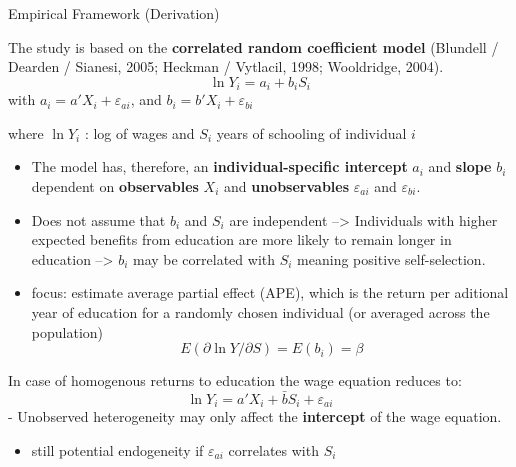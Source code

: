 \documentclass[10pt,ignorenonframetext,]{beamer}
\providecommand{\tightlist}{%
  \setlength{\itemsep}{0pt}\setlength{\parskip}{0pt}}
\begin{document}
\begin{frame}[allowframebreaks]{Empirical Framework (Derivation)}
\protect\hypertarget{empirical-framework-derivation}{}

The study is based on the \textbf{correlated random coefficient model}
(Blundell / Dearden / Sianesi, 2005; Heckman / Vytlacil, 1998;
Wooldridge, 2004). \[\ln Y_i = a_i + b_i S_i\] with
\(a_i = a'X_i + \varepsilon_{ai}\), and
\(b_i = b'X_i + \varepsilon_{bi}\)

where \(\ln Y_i\) : log of wages and \(S_i\) years of schooling of
individual \(i\)

\begin{itemize}
\item
  The model has, therefore, an \textbf{individual-specific intercept}
  \(a_i\) and \textbf{slope} \(b_i\) dependent on \textbf{observables}
  \(X_i\) and \textbf{unobservables} \(\varepsilon_{ai}\) and
  \(\varepsilon_{bi}\).
\item
  Does not assume that \(b_i\) and \(S_i\) are independent
  --\textgreater{} Individuals with higher expected benefits from
  education are more likely to remain longer in education
  --\textgreater{} \(b_i\) may be correlated with \(S_i\) meaning
  positive self-selection.
\item
  focus: estimate average partial effect (APE), which is the return per
  aditional year of education for a randomly chosen individual (or
  averaged across the population)
  \[E(\partial \ln Y / \partial S) = E(b_i) = \beta\]
\end{itemize}

In case of homogenous returns to education the wage equation reduces to:
\[\ln Y_i = a'X_i + \bar b S_i + \varepsilon_{ai}\] - Unobserved
heterogeneity may only affect the \textbf{intercept} of the wage
equation.

\begin{itemize}
\tightlist
\item
  still potential endogeneity if \(\varepsilon_{ai}\) correlates with
  \(S_i\)
\end{itemize}

\end{frame}
\end{document}
